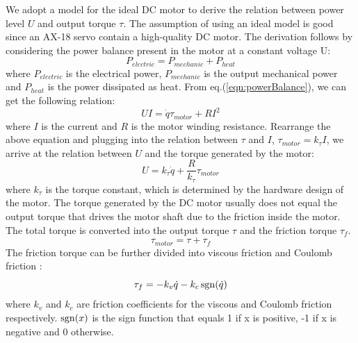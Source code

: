 We adopt a model for the ideal DC motor \cite{SchwarzB:2013} to derive the relation between power level $U$ and output torque $\tau$. The assumption of using an ideal model is good since an AX-18 servo contain a high-quality DC motor. The derivation follows by considering the power balance present in the motor at a constant voltage U:
\begin{equation}
  P_{electric} = P_{mechanic} + P_{heat}
  \label{eqn:powerBalance}
\end{equation}
where $P_{electric}$ is the electrical power, $P_{mechanic}$ is the output mechanical power and $P_{heat}$ is the power dissipated as heat. From eq.(\ref{eqn:powerBalance}), we can get the following relation:
\begin{equation}
UI=\dot{q}\tau_{motor} + RI^2
\end{equation}
where $I$ is the current and $R$ is the motor winding resistance. Rearrange the above equation and plugging into the relation between $\tau$ and $I$, $\tau_{motor}=k_{\tau}I$, we arrive at the relation between $U$ and the torque generated by the motor:
\begin{equation}
  U=k_{\tau}\dot{q}+\frac{R}{k_{\tau}}\tau_{motor}
  \label{eqn:votageTorqueRelation}
\end{equation}
where $k_{\tau}$ is the torque constant, which is determined by the hardware design of the motor. The torque generated by the DC motor usually does not equal the output torque that drives the motor shaft due to the friction inside the motor. The total torque is converted into the output torque $\tau$ and the friction torque $\tau_f$.
\begin{equation}
  \tau_{motor}=\tau+\tau_f
  \label{eqn:torqueBalance}
\end{equation}
The friction torque can be further divided into viscous friction and Coulomb friction \cite{SchwarzB:2013}:
\begin{equation}
  \tau_f = -k_v\dot{q}-k_c\operatorname{sgn}(\dot{q})
  \label{eqn:frictionComponents}
\end{equation}
where $k_v$ and $k_c$ are friction coefficients for the viscous and Coulomb friction respectively. $\operatorname{sgn}(x)$ is the sign function that equals 1 if x is positive, -1 if x is negative and 0 otherwise.

